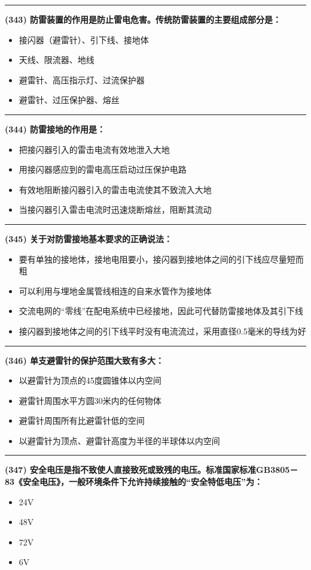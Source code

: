 \documentclass[twocolumn]{ctexart}  %
\begin{document}
\noindent\rule{0.5\textwidth}{1pt}
\heiti \textbf{(343) 防雷装置的作用是防止雷电危害。传统防雷装置的主要组成部分是：} \songti {\color{gray} [LK0996] }
\begin{itemize}
	\item  接闪器（避雷针）、引下线、接地体
	\item  天线、限流器、地线
	\item  避雷针、高压指示灯、过流保护器
	\item  避雷针、过压保护器、熔丝
\end{itemize}


\noindent\rule{0.5\textwidth}{1pt}
\heiti \textbf{(344) 防雷接地的作用是：} \songti {\color{gray} [LK0997] }
\begin{itemize}
	\item  把接闪器引入的雷击电流有效地泄入大地
	\item  用接闪器感应到的雷电高压启动过压保护电路
	\item  有效地阻断接闪器引入的雷击电流使其不致流入大地
	\item  当接闪器引入雷击电流时迅速烧断熔丝，阻断其流动
\end{itemize}


\noindent\rule{0.5\textwidth}{1pt}
\heiti \textbf{(345) 关于对防雷接地基本要求的正确说法：} \songti {\color{gray} [LK0998] }
\begin{itemize}
	\item  要有单独的接地体，接地电阻要小，接闪器到接地体之间的引下线应尽量短而粗
	\item  可以利用与埋地金属管线相连的自来水管作为接地体
	\item  交流电网的“零线”在配电系统中已经接地，因此可代替防雷接地体及其引下线
	\item  接闪器到接地体之间的引下线平时没有电流流过，采用直径0.5毫米的导线为好
\end{itemize}


\noindent\rule{0.5\textwidth}{1pt}
\heiti \textbf{(346) 单支避雷针的保护范围大致有多大：} \songti {\color{gray} [LK0999] }
\begin{itemize}
	\item  以避雷针为顶点的45度圆锥体以内空间
	\item  避雷针周围水平方圆30米内的任何物体
	\item  避雷针周围所有比避雷针低的空间
	\item  以避雷针为顶点、避雷针高度为半径的半球体以内空间
\end{itemize}


\noindent\rule{0.5\textwidth}{1pt}
\heiti \textbf{(347) 安全电压是指不致使人直接致死或致残的电压。标准国家标准GB3805－83《安全电压》，一般环境条件下允许持续接触的“安全特低电压”为：} \songti {\color{gray} [LK1000] }
\begin{itemize}
	\item  24V
	\item  48V
	\item  72V
	\item  6V
\end{itemize}
\end{document}

